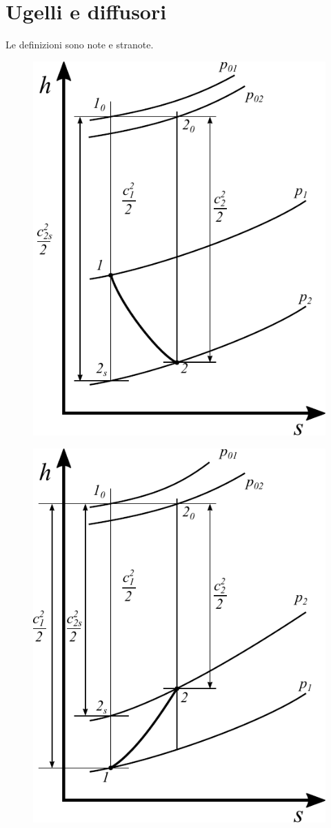 \section{Ugelli e diffusori}
Le definizioni sono note e stranote.
\begin{figure}
\centering
\begin{minipage}{.5\textwidth}
  \centering
  \includegraphics[width=.6\linewidth]{fig/Ugello.pdf}
  \label{}
\end{minipage}%
\begin{minipage}{.5\textwidth}
  \centering
  \includegraphics[width=.6\linewidth]{fig/Diffusore.pdf}
  \label{}
\end{minipage}
\end{figure}
